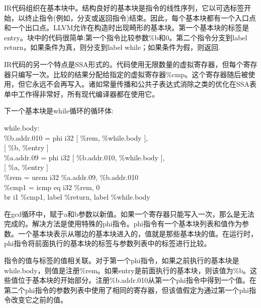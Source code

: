 IR代码组织在基本块中。结构良好的基本块是指令的线性序列，它以可选标签开始，以终止指令(例如，分支或返回指令)结束。因此，每个基本块都有一个入口点和一个出口点。LLVM允许在构造时出现畸形的基本块。第一个基本块的标签是entry。块中的代码很简单:第一个指令比较参数\%b和0。第二个指令分支到label return，如果条件为真，则分支到label while；如果条件为假，则返回.\par

IR代码的另一个特点是SSA形式的。代码使用无限数量的虚拟寄存器，但每个寄存器只编写一次。比较的结果分配给指定的虚拟寄存器\%cmp。这个寄存器随后被使用，但它永远不会再写入。诸如常量传播和公共子表达式消除之类的优化在SSA表单中工作得非常好，所有现代编译器都在使用它。\par

下一个基本块是while循环的循环体:\par

\begin{tcolorbox}[colback=white,colframe=black]
while.body: \\
\hspace*{0.5cm}\%b.addr.010 = phi i32 [ \%rem, \%while.body ], \\
\hspace*{3.5cm}[ \%b, \%entry ] \\
\hspace*{0.5cm}\%a.addr.09 = phi i32 [ \%b.addr.010, \%while.body ], \\
\hspace*{3.5cm}[ \%a, \%entry ] \\
\hspace*{0.5cm}\%rem = urem i32 \%a.addr.09, \%b.addr.010 \\
\hspace*{0.5cm}\%cmp1 = icmp eq i32 \%rem, 0 \\
\hspace*{0.5cm}br i1 \%cmp1, label \%return, label \%while.body
\end{tcolorbox}

在gcd循环中，赋于a和b参数以新值。如果一个寄存器只能写入一次，那么是无法完成的。解决方法是使用特殊的phi指令。phi指令有一个基本块列表和值作为参数。一个基本块表示从哪边的基本块进入的，值就是那些基本块的值。在运行时，phi指令将前面执行的基本块的标签与参数列表中的标签进行比较。\par

指令的值与标签的值相关联。对于第一个phi指令，如果之前执行的基本块是while.body，则值是注册\%rem。如果entry是前面执行的基本块，则该值为\%b。这些值位于基本块的开始部分。注册\%b.addr.010从第一个phi指令中得到一个值。在第二个phi指令的参数列表中使用了相同的寄存器，但该值假定为通过第一个phi指令改变它之前的值。\par

